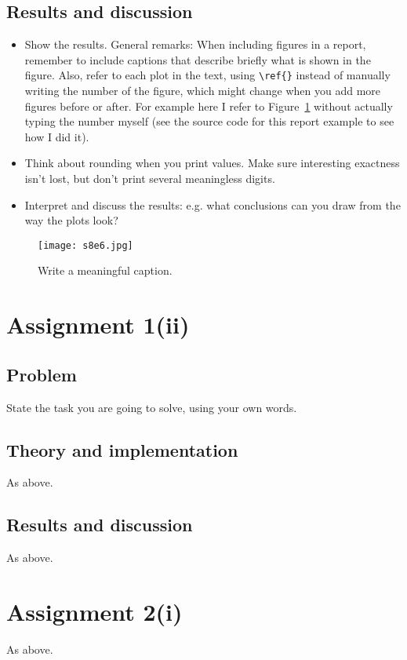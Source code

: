 \documentclass[11pt,a4paper]{article}
\begin{document}
\subsection{Results and discussion}
\begin{itemize}
\item Show the results. General remarks: When including figures in a report, remember to include captions that describe briefly what is shown in the figure. Also, refer to each plot in the text, using \verb|\ref{}| instead of manually writing the number of the figure, which might change when you add more figures before or after. For example here I refer to Figure~\ref{myfigure}  without actually typing the number myself (see the source code for this report example to see how I did it).
\item Think about rounding when you print values. Make sure interesting exactness isn't lost, but don't print several meaningless digits.
\item Interpret and discuss the results: e.g. what conclusions can you draw from the way the plots look?
\end{itemize}

\begin{figure}
    \centering
    \texttt{[image: s8e6.jpg]}  %
    \caption{Write a meaningful caption.}
    \label{myfigure}  %
\end{figure}

\section{Assignment 1(ii)}
\subsection{Problem}
State the task you are going to solve, using your own words.
\subsection{Theory and implementation}
As above.
\subsection{Results and discussion}
As above.

\section{Assignment 2(i)}
As above.
\end{document}
